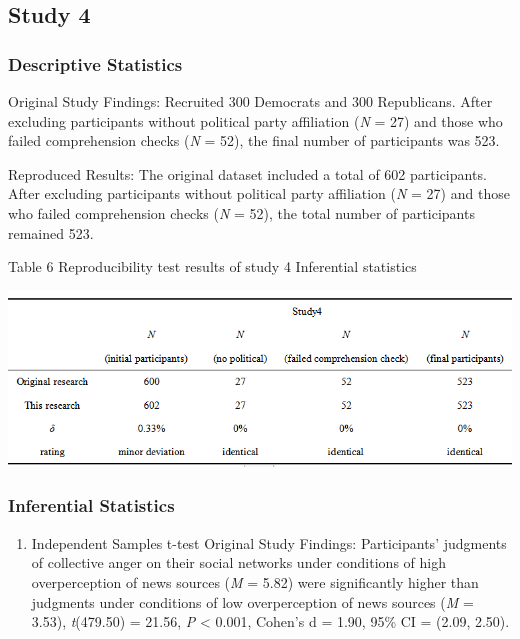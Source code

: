 \documentclass[
  man]{apa6}
\providecommand{\tightlist}{%
  \setlength{\itemsep}{0pt}\setlength{\parskip}{0pt}}
\begin{document}
\hypertarget{study-4-1}{%
\subsection{Study 4}\label{study-4-1}}

\hypertarget{descriptive-statistics-3}{%
\subsubsection{Descriptive Statistics}\label{descriptive-statistics-3}}

Original Study Findings: Recruited 300 Democrats and 300 Republicans. After excluding participants without political party affiliation (\emph{N} = 27) and those who failed comprehension checks (\emph{N} = 52), the final number of participants was 523.

Reproduced Results: The original dataset included a total of 602 participants. After excluding participants without political party affiliation (\emph{N} = 27) and those who failed comprehension checks (\emph{N} = 52), the total number of participants remained 523.

\begin{center}
Table 6 Reproducibility test results of study 4 Inferential statistics
\end{center}
\begin{center}
\includegraphics{study4_Reproducibility_Plot.png}
\end{center}

\hypertarget{inferential-statistics-3}{%
\subsubsection{Inferential Statistics}\label{inferential-statistics-3}}

\begin{enumerate}
\def\labelenumi{\arabic{enumi}.}
\tightlist
\item
  Independent Samples t-test
  Original Study Findings: Participants' judgments of collective anger on their social networks under conditions of high overperception of news sources (\emph{M} = 5.82) were significantly higher than judgments under conditions of low overperception of news sources (\emph{M} = 3.53), \emph{t}(479.50) = 21.56, \emph{P} \textless{} 0.001, Cohen's d = 1.90, 95\% CI = (2.09, 2.50).
\end{enumerate}
\end{document}
